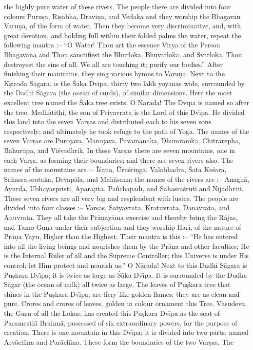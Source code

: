 the highly pure water of these rivers. The people there are divided into four colours Puru\d{s}a, Ri\d{s}abha, Dravi\d{n}a, and Vedaka and they worship the Bhagav\=an Varu\d{n}a, of the form of water. Then they become very discriminative, and, with great devotion, and holding full within their folded palms the water, repeat the following mantra :-- ``O Water! Thou art the essence V\={\i}rya of the Person Bhagav\=ana and Thou sanctifiest the Bh\=urloka, Bhuvarloka, and Svarloka. Thou destroyest the sins of all. We all are touching it; purify our bodies.'' After finishing their mantrams, they sing various hymns to Varu\d{n}a. Next to the K\d{s}iroda S\=agara, is the \'Saka Dv\={\i}pa, thirty two lakh yoyanas wide, surrounded by the Dadhi S\=agara (the ocean of curds), of similar dimensions. Here the most excellent tree named the \'Saka tree exists. O N\=arada! The Dv\={\i}pa is named so after the tree. Medh\=atithi, the son of Priyavrata is the Lord of this Dv\={\i}pa. He divided this land into the seven Var\d{s}as and distributed each to his seven sons respectively; and ultimately he took refuge to the path of Yoga. The names of the seven Var\d{s}as are Purojava, Manojava, Pavam\=anaka, Dh\=umr\=an\={\i}ka, Chitrarepha, Bahur\=upa, and Vi\'svadhrik. In these Var\d{s}as there are seven mountains, one in each Var\d{s}a, as forming their boundaries; and there are seven rivers also. The names of the mountains are :-- \=I\'sana, \=Uru\'sri\d{n}ga, Valabhadra, \'Sata Ke\'sara, Sahasra-srotaka, Devap\=ala, and Mah\=asana; the names of the rivers are :-- Anagh\=a, \=Ayurd\=a, Ubhayaspristi, Apar\=ajit\=a, Pa\~nchapad\={\i}, and Sahasra\'sruti and Nijadhriti. These seven rivers are all very big and resplendent with lustre. The people are divided into four classes :-- Var\d{s}as, Satyavrata, Kratuvrata, D\=anavrata, and A\d{n}uvrata. They all take the Pr\=a\d{n}ay\=ama exercise and thereby bring the R\=ajas, and Tamo Gu\d{n}a under their subjection and they worship Hari, of the nature of Pr\=a\d{n}a Vayu, Higher than the Highest. Their mantra is this :-- ``He has entered into all the living beings and nourishes them by the Pr\=a\d{n}a and other faculties; He is the Internal Ruler of all and the Supreme Controller; this Universe is under His control; let Him protect and nourish us.'' O N\=arada! Next to this Dadhi S\=agara is Pu\d{s}kara Dv\={\i}pa; it is twice as large as \'S\=aka Dv\={\i}pa. It is surrounded by the Dudha S\=agar (the ocean of milk) all twice as large. The leaves of Pu\d{s}kara tree that shines in the Pu\d{s}kara Dv\={\i}pa, are fiery like golden flames; they are as clean and pure. Crores and crores of leaves, golden in colour ornament this Tree. V\=asudeva, the Guru of all the Lokas, has created this Pu\d{s}kara Dv\={\i}pa as the seat of Paramesth\={\i} Brahm\=a, possessed of six extraordinary powers, for the purpose of creation. There is one mountain in this Dv\={\i}pa; it is divided into two parts, named Arv\=ach\={\i}na and Par\=ach\={\i}na. These form the boundaries of the two Var\d{s}as. The

